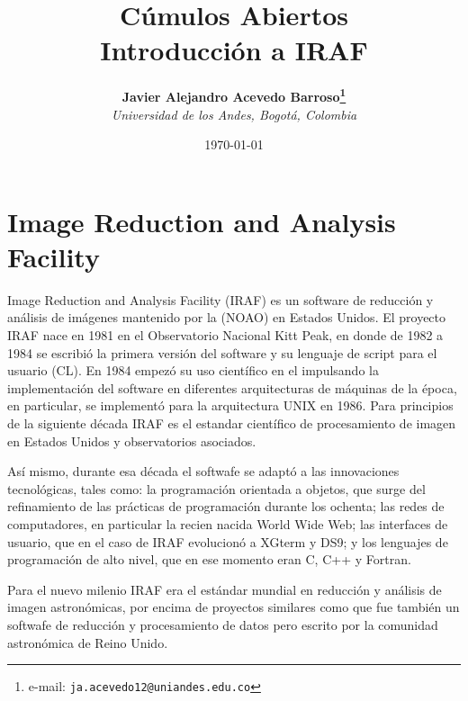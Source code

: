 \documentclass[12pt]{article}
\begin{document}
\title{Cúmulos Abiertos \\ Introducción a IRAF}

\author{
\textbf{Javier Alejandro Acevedo Barroso\thanks{e-mail: \texttt{ja.acevedo12@uniandes.edu.co}}}\\
\textit{Universidad de los Andes, Bogotá, Colombia}\\
 }%
 
\date{\today}
\maketitle %

\normalsize


\section{Image Reduction and Analysis Facility}
Image Reduction and Analysis Facility (IRAF) es un software de reducción y análisis de imágenes mantenido por la  (NOAO) en Estados Unidos. El proyecto IRAF nace en 1981 en el Observatorio Nacional Kitt Peak, en donde de 1982 a 1984 se escribió la primera versión del software y su lenguaje de script para el usuario  (CL). En 1984 empezó su uso científico en el  impulsando la implementación del software en diferentes arquitecturas de máquinas de la época, en particular, se implementó para la arquitectura UNIX en 1986. Para principios de la siguiente década IRAF es el estandar científico de procesamiento de imagen en Estados Unidos y observatorios asociados\cite{IRAFinThe80}. 

Así mismo, durante esa década el softwafe se adaptó a las innovaciones tecnológicas, tales como: la programación orientada a objetos, que surge del refinamiento de las prácticas de programación durante los ochenta; las redes de computadores, en particular la recien nacida World Wide Web; las interfaces de usuario, que en el caso de IRAF evolucionó a XGterm y DS9; y los lenguajes de programación de alto nivel, que en ese momento eran C, C++ y Fortran\cite{IRAFinThe90}.

Para el nuevo milenio IRAF era el estándar mundial en reducción y análisis de imagen astronómicas, por encima de proyectos similares como  que fue también un softwafe de reducción y procesamiento de datos pero escrito por la comunidad astronómica de Reino Unido.
\end{document}
